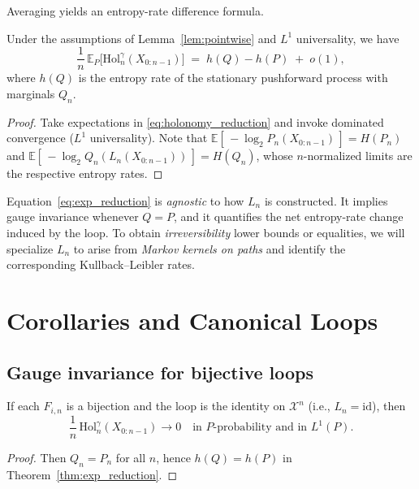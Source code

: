 \documentclass[11pt]{article}
\newcommand{\X}{\mathcal{X}}
\newcommand{\E}{\mathbb{E}}
\newcommand{\1}{\mathbbm{1}}
\begin{document}
Averaging yields an entropy-rate difference formula.

\begin{theorem}\label{thm:exp_reduction}
Under the assumptions of Lemma~\ref{lem:pointwise} and $L^1$ universality, we have
\begin{equation}\label{eq:exp_reduction}
\frac{1}{n}\,\E_P\big[\mathrm{Hol}_n^\gamma(X_{0:n-1})\big]
\;=\;
h(Q) - h(P) \;+\; o(1),
\end{equation}
where $h(Q)$ is the entropy rate of the stationary pushforward process with marginals $Q_n$.
\end{theorem}
\begin{proof}
Take expectations in \eqref{eq:holonomy_reduction} and invoke dominated convergence ($L^1$ universality).
Note that $\E[\,-\log_2 P_n(X_{0:n-1})\,]=H(P_n)$ and $\E[\,-\log_2 Q_n(L_n(X_{0:n-1}))\,]=H(Q_n)$, whose $n$-normalized limits are the respective entropy rates.
\end{proof}

\begin{remark}[Scope]
Equation~\eqref{eq:exp_reduction} is \emph{agnostic} to how $L_n$ is constructed.
It implies gauge invariance whenever $Q=P$, and it quantifies the net entropy-rate change induced by the loop.
To obtain \emph{irreversibility} lower bounds or equalities, we will specialize $L_n$ to arise from \emph{Markov kernels on paths} and identify the corresponding Kullback--Leibler rates.
\end{remark}

\section{Corollaries and Canonical Loops}

\subsection{Gauge invariance for bijective loops}

\begin{corollary}\label{cor:gauge}
If each $F_{i,n}$ is a bijection and the loop is the identity on $\X^n$ (i.e., $L_n=\mathrm{id}$), then
\[
\frac{1}{n}\,\mathrm{Hol}_n^\gamma(X_{0:n-1}) \to 0\quad\text{in }P\text{-probability and in }L^1(P).
\]
\end{corollary}
\begin{proof}
Then $Q_n=P_n$ for all $n$, hence $h(Q)=h(P)$ in Theorem~\ref{thm:exp_reduction}.
\end{proof}
\end{document}
